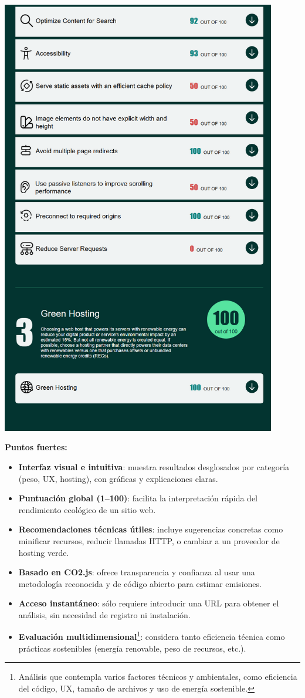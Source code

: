 \documentclass[12pt,a4paper]{report}
\begin{document}
\begin{center}
  \includegraphics[width=0.9\textwidth]{imagenes/Ecograder_5.png}
\end{center}

\textbf{Puntos fuertes:}
\begin{itemize}
  \item \textbf{Interfaz visual e intuitiva}: muestra resultados desglosados por categoría (peso, UX, hosting), con gráficas y explicaciones claras.
  \item \textbf{Puntuación global (1–100)}: facilita la interpretación rápida del rendimiento ecológico de un sitio web.
  \item \textbf{Recomendaciones técnicas útiles}: incluye sugerencias concretas como minificar recursos, reducir llamadas HTTP, o cambiar a un proveedor de hosting verde.
  \item \textbf{Basado en CO2.js}: ofrece transparencia y confianza al usar una metodología reconocida y de código abierto para estimar emisiones.
  \item \textbf{Acceso instantáneo}: sólo requiere introducir una URL para obtener el análisis, sin necesidad de registro ni instalación.
  \item \textbf{Evaluación multidimensional}\footnote{Análisis que contempla varios factores técnicos y ambientales, como eficiencia del código, UX, tamaño de archivos y uso de energía sostenible.}: considera tanto eficiencia técnica como prácticas sostenibles (energía renovable, peso de recursos, etc.).
\end{itemize}
\end{document}
